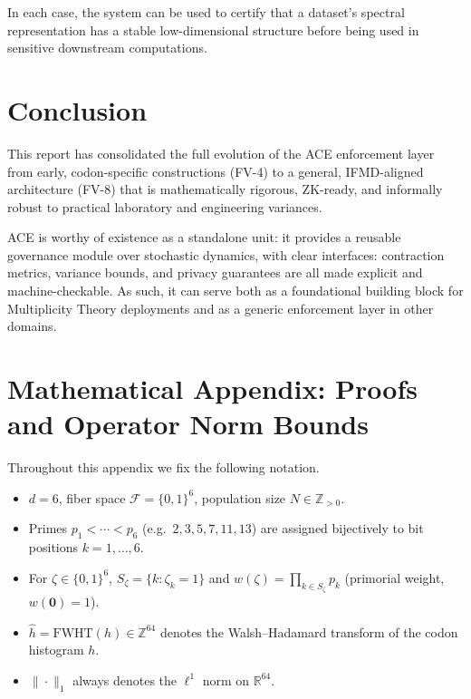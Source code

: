 \documentclass[11pt]{article}
\begin{document}
In each case, the system can be used to certify that a dataset's spectral representation has a stable low-dimensional structure before being used in sensitive downstream computations.

\section{Conclusion}

This report has consolidated the full evolution of the ACE enforcement layer from early, codon-specific constructions (FV-4) to a general, IFMD-aligned architecture (FV-8) that is mathematically rigorous, ZK-ready, and informally robust to practical laboratory and engineering variances.

ACE is worthy of existence as a standalone unit: it provides a reusable governance module over stochastic dynamics, with clear interfaces:
contraction metrics, variance bounds, and privacy guarantees are all made explicit and machine-checkable. As such, it can serve both as a foundational building block for Multiplicity Theory deployments and as a generic enforcement layer in other domains.


\appendix
\setcounter{section}{0}
\renewcommand{\thesection}{\Alph{section}}

\section{Mathematical Appendix: Proofs and Operator Norm Bounds}

Throughout this appendix we fix the following notation.
\begin{itemize}[nosep]
  \item $d = 6$, fiber space $\mathcal{F} = \{0,1\}^6$, population size $N \in \mathbb{Z}_{>0}$.
  \item Primes $p_1 < \cdots < p_6$ (e.g.\ $2,3,5,7,11,13$) are assigned
        bijectively to bit positions $k = 1,\ldots,6$.
  \item For $\zeta \in \{0,1\}^6$, $S_\zeta = \{k : \zeta_k = 1\}$ and
        $w(\zeta) = \prod_{k\in S_\zeta} p_k$ (primorial weight, $w(\bm{0})=1$).
  \item $\hat{h} = \mathrm{FWHT}(h) \in \mathbb{Z}^{64}$ denotes the 
        Walsh--Hadamard transform of the codon histogram $h$.
  \item $\|\cdot\|_1$ always denotes the $\ell^1$ norm on $\mathbb{R}^{64}$.
\end{itemize}
\end{document}
